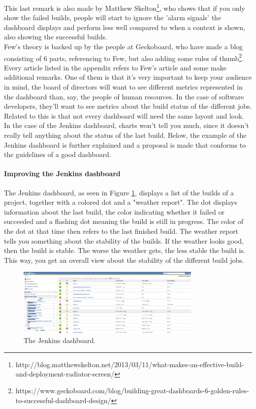 \documentclass[10pt,a4paper]{article}
\begin{document}
\begin{appendices}
This last remark is also made by Matthew Skelton\footnote{http://blog.matthewskelton.net/2013/03/11/what-makes-an-effective-build-and-deployment-radiator-screen/}, who shows that if you only show the failed builds, people will start to ignore the 'alarm signals' the dashboard displays and perform less well compared to when a context is shown, also showing the successful builds. \\
Few’s theory is backed up by the people at Geckoboard, who have made a blog consisting of 6 parts, referencing to Few, but also adding some rules of thumb\footnote{https://www.geckoboard.com/blog/building-great-dashboards-6-golden-rules-to-successful-dashboard-design/}. Every article listed in the appendix refers to Few’s article and some make additional remarks. 
One of them is that it’s very important to keep your audience in mind, the board of directors will want to see different metrics represented in the dashboard than, say, the people of human resources. 
In the case of software developers, they’ll want to see metrics about the build status of the different jobs. Related to this is that not every dashboard will need the same layout and look. \\
In the case of the Jenkins dashboard, charts won’t tell you much, since it doesn’t really tell anything about the status of the last build. Below, the example of the Jenkins dashboard is further explained and a proposal is made that conforms to the guidelines of a good dashboard.

\paragraph{Improving the Jenkins dashboard}
The Jenkins dashboard, as seen in Figure \ref{jenkins}, displays a list of the builds of a project, together with a colored dot and a "weather report". The dot displays information about the last build, the color indicating whether it failed or succeeded and a flashing dot meaning the build is still in progress. 
The color of the dot at that time then refers to the last finished build.
The weather report tells you something about the stability of the builds. If the weather looks good, then the build is stable. The worse the weather gets, the less stable the build is. This way, you get an overall view about the stability of the different build jobs.

\begin{figure}[ht!]
\centering
\includegraphics[width=90mm]{CaptureJenkins.png}
\caption{The Jenkins dashboard.} 
\label{jenkins}
\end{figure}
 

\end{appendices}
\end{document}
